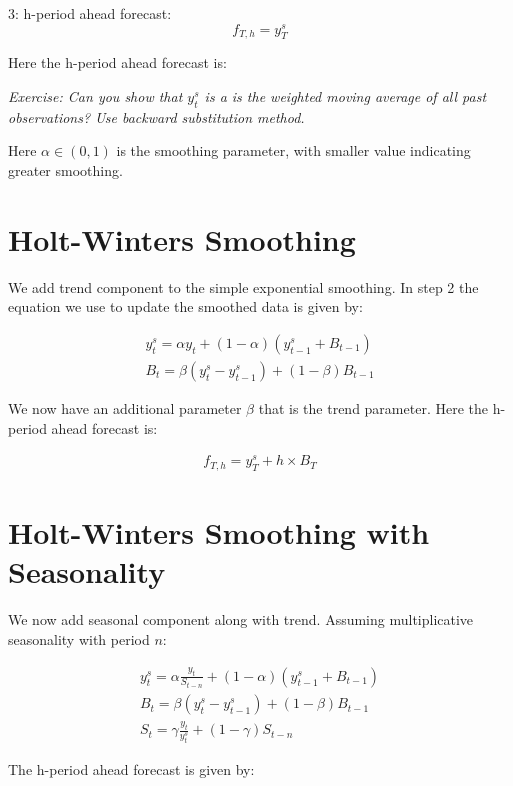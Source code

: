 \documentclass[]{book}
\theoremstyle{definition}
\theoremstyle{definition}
\theoremstyle{definition}
\theoremstyle{remark}
\begin{document}
3: h-period ahead forecast:
\[f_{T,h}= y_T^s\]

Here the h-period ahead forecast is:

\emph{Exercise: Can you show that \(y_{t}^{s}\) is a is the weighted moving average of all past observations? Use backward substitution method.}

Here \(\alpha \in (0,1)\) is the smoothing parameter, with smaller value indicating greater smoothing.

\hypertarget{holt-winters-smoothing}{%
\section{Holt-Winters Smoothing}\label{holt-winters-smoothing}}

We add trend component to the simple exponential smoothing. In step 2 the equation we use to update the smoothed data is given by:

\begin{align}
    y_{t}^{s}= \alpha y_t + (1-\alpha)(y_{t-1}^{s}+B_{t-1}) \\ \nonumber
    B_t = \beta (y_t^s -y_{t-1}^s) + (1-\beta) B_{t-1}
 \end{align}

We now have an additional parameter \(\beta\) that is the trend parameter. Here the h-period ahead forecast is:

\begin{align}
  f_{T,h} = y_T^s + h\times B_T
  \end{align}

\hypertarget{holt-winters-smoothing-with-seasonality}{%
\section{Holt-Winters Smoothing with Seasonality}\label{holt-winters-smoothing-with-seasonality}}

We now add seasonal component along with trend. Assuming multiplicative seasonality with period \(n\):

\begin{align}
    y_{t}^{s}= \alpha \frac{y_t}{S_{t-n}} + (1-\alpha)(y_{t-1}^{s}+B_{t-1})\\
    B_t = \beta (y_t^s -y_{t-1}^s) + (1-\beta) B_{t-1}\\
    S_t = \gamma\frac{y_t}{y_t^s}+(1-\gamma)S_{t-n}
  \end{align}

The h-period ahead forecast is given by:
\end{document}
